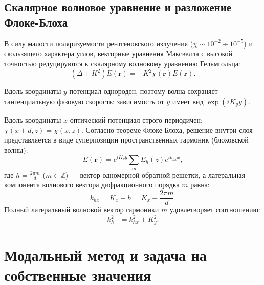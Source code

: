 \documentclass[a4paper,11pt]{article}
\begin{document}
\subsection{Скалярное волновое уравнение и разложение Флоке-Блоха}
В силу малости поляризуемости рентгеновского излучения ($\chi \sim 10^{-2} \div 10^{-5}$) и скользящего характера углов, векторные уравнения Максвелла с высокой точностью редуцируются к скалярному волновому уравнению Гельмгольца:
\begin{equation}
\left( \Delta + K^2 \right) E(\mathbf{r}) = -K^2 \chi(\mathbf{r}) E(\mathbf{r}).
\label{eq:helmholtz}
\end{equation}

Вдоль координаты $y$ потенциал однороден, поэтому волна сохраняет тангенциальную фазовую скорость: зависимость от $y$ имеет вид $\exp(i K_y y)$.

Вдоль координаты $x$ оптический потенциал строго периодичен: $\chi(x + d, z) = \chi(x, z)$. Согласно теореме Флоке-Блоха, решение внутри слоя представляется в виде суперпозиции пространственных гармоник (блоховской волны):
\begin{equation}
E(\mathbf{r}) = e^{i K_y y} \sum_{m} E_h(z) e^{i k_{hx} x},
\label{eq:bloch_series}
\end{equation}
где $h = \frac{2\pi m}{d}$ ($m \in \mathbb{Z}$) --- вектор одномерной обратной решетки, а латеральная компонента волнового вектора дифракционного порядка $m$ равна:
\begin{equation}
k_{hx} = K_x + h = K_x + \frac{2\pi m}{d}.
\end{equation}
Полный латеральный волновой вектор гармоники $m$ удовлетворяет соотношению:
\begin{equation}
k_{h\parallel}^2 = k_{hx}^2 + K_y^2.
\end{equation}

\section{Модальный метод и задача на собственные значения}
\end{document}
